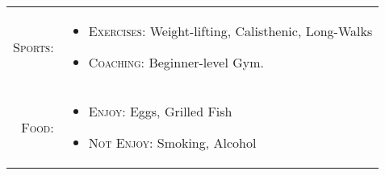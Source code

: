%
%



\begin{tabular}{>{}r>{}p{13cm}}
    \textsc{Sports:} &
        \begin{itemize}
            \item \textsc{Exercises:} Weight-lifting, Calisthenic, Long-Walks
            \item \textsc{Coaching:} Beginner-level Gym.
        \end{itemize} \\

    \textsc{Food:} &
        \begin{itemize}
        \item \textsc{Enjoy:} Eggs, Grilled Fish
        \item \textsc{Not Enjoy:} Smoking, Alcohol
        \end{itemize}
\end{tabular}
